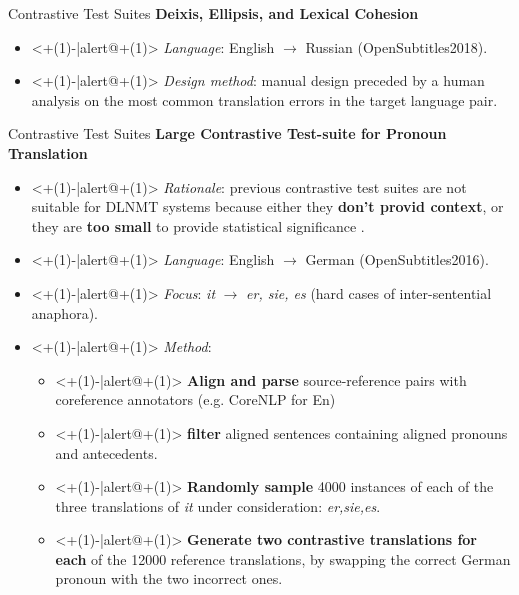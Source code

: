 \begin{frame}{Contrastive Test Suites}
	\textbf{Deixis, Ellipsis, and Lexical Cohesion} \cite{voita_when_2019}
	\begin{itemize}
		\item<+(1)-|alert@+(1)> \textit{Language}: English $\rightarrow$ Russian (OpenSubtitles2018).
		\item<+(1)-|alert@+(1)> \textit{Design method}: manual design preceded by a human analysis on the most common translation errors in the target language pair.
	\end{itemize}
\end{frame}

\begin{frame}{Contrastive Test Suites}
	\textbf{Large Contrastive Test-suite for Pronoun Translation} \cite{muller_large-scale_2018}
	\begin{itemize}
		\item<+(1)-|alert@+(1)> \textit{Rationale}: previous contrastive test suites are not suitable for DLNMT systems because either they \textbf{don't provid context}, or they are \textbf{too small} to provide statistical significance \cite{bawden_evaluating_2018}.
		\item<+(1)-|alert@+(1)> \textit{Language}: English $\rightarrow$ German (OpenSubtitles2016).
		\item<+(1)-|alert@+(1)> \textit{Focus}: \textit{it} $\rightarrow$ \textit{er, sie, es} (hard cases of inter-sentential anaphora).
		\item<+(1)-|alert@+(1)> \textit{Method}:
		\begin{itemize}
			\item<+(1)-|alert@+(1)> \textbf{Align and parse} source-reference pairs with coreference annotators (e.g. CoreNLP for En)
			\item<+(1)-|alert@+(1)> \textbf \textbf{filter} aligned sentences containing aligned pronouns and antecedents.
			\item<+(1)-|alert@+(1)> \textbf{Randomly sample} 4000 instances of each of the three translations of \textit{it} under consideration: \textit{er,sie,es}.
			\item<+(1)-|alert@+(1)> \textbf{Generate two contrastive translations for each} of the 12000 reference translations, by swapping the correct German pronoun with the two incorrect ones.
		\end{itemize} 
	\end{itemize}
\end{frame}

